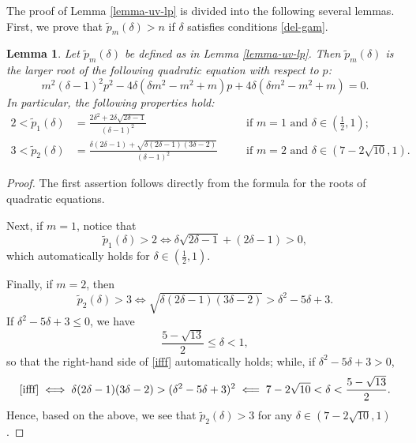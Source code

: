 \documentclass[11pt,reqno]{amsart}
\newtheorem{lem}{Lemma}[section]
\numberwithin{rk}{section}
\numberwithin{prop}{section}
\numberwithin{mydef}{section}
\numberwithin{lem}{section}
\numberwithin{equation}{section}
\numberwithin{thm}{section}
\begin{document}
The proof of Lemma \ref{lemma-uv-lp} is divided into the following several lemmas. First, we prove that $\tilde{p}_m(\delta)>n$ if $\delta$ satisfies conditions \eqref{del-gam}.
\begin{lem}\label{Lemma-pp}
Let $\tilde{p}_m(\delta)$ be defined as in {\rm Lemma \ref{lemma-uv-lp}}. Then $\tilde{p}_m(\delta)$ is the larger root of the following quadratic equation with respect to $p${\rm:}
\begin{equation*}
m^2(\delta-1)^2p^2-4\delta(\delta m^2-m^2+m)p+4\delta(\delta m^2-m^2+m)=0.
\end{equation*}
In particular, the following properties hold{\rm:}
\begin{equation*}
\begin{aligned}
2<\tilde{p}_1(\delta)&=\frac{2\delta^2+2\delta\sqrt{2\delta-1}}{(\delta-1)^2}\quad&&\text{if $m=1$ and $\delta\in (\frac{1}{2},1)$};\\
3<\tilde{p}_2(\delta)&=\frac{\delta(2\delta-1)+\sqrt{\delta(2\delta-1)(3\delta-2)}}{(\delta-1)^2}\quad&&\text{if $m=2$ and $\delta\in (7-2\sqrt{10},1)$}.
\end{aligned}
\end{equation*}
\end{lem}
\begin{proof}
The first assertion follows directly from the formula for the roots of quadratic equations.

Next, if $m=1$, notice that
\begin{equation*}
\tilde p_1(\delta)>2\iff   \delta\sqrt{2\delta-1}+(2\delta-1)>0,
\end{equation*}
which automatically holds for $\delta\in (\frac{1}{2},1)$. 

Finally, if $m=2$, then
\begin{equation}\label{ifff}
\tilde p_2(\delta)>3\iff  \sqrt{\delta(2\delta-1)(3\delta-2)}>\delta^2-5\delta+3.  
\end{equation}
If $\delta^2-5\delta+3\leq 0$, we have
\begin{equation*}
\frac{5-\sqrt{13}}{2}\leq \delta<1,
\end{equation*}
so that the right-hand side of \eqref{ifff} automatically holds; 
while, if $\delta^2-5\delta+3>0$, 
\begin{equation*}
\eqref{ifff}\iff \delta(2\delta-1)(3\delta-2)>(\delta^2-5\delta+3)^2\impliedby 7-2\sqrt{10}<\delta<\frac{5-\sqrt{13}}{2}.
\end{equation*}
Hence, based on the above, we see that 
$\tilde p_2(\delta)>3$ for any $\delta\in (7-2\sqrt{10},1)$.
\end{proof}
\end{document}
